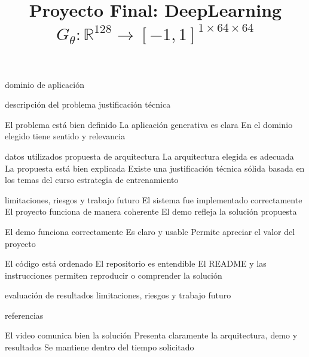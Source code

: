 \documentclass{tex-notes}
\title{\vspace{-2em}Proyecto Final: DeepLearning\\
  {\large \textnormal{%
    $G_\theta : \mathbb{R}^{128} \longrightarrow [-1, 1]^{1 \times 64 \times 64}$%
  }}}
\author{}
\date{}
\begin{document}
\maketitle
\vspace{-2.5em}



dominio de aplicación

descripción del problema
justificación técnica

El problema está bien definido
La aplicación generativa es clara
En el dominio elegido tiene sentido y relevancia



datos utilizados
propuesta de arquitectura
La arquitectura elegida es adecuada
La propuesta está bien explicada
Existe una justificación técnica sólida basada en los temas del curso
estrategia de entrenamiento


limitaciones, riesgos y trabajo futuro
El sistema fue implementado correctamente
El proyecto funciona de manera coherente
El demo refleja la solución propuesta

El demo funciona correctamente
Es claro y usable
Permite apreciar el valor del proyecto

El código está ordenado
El repositorio es entendible
El README y las instrucciones permiten reproducir o comprender la solución



evaluación de resultados
limitaciones, riesgos y trabajo futuro

referencias


El video comunica bien la solución
Presenta claramente la arquitectura, demo y resultados
Se mantiene dentro del tiempo solicitado
\end{document}
